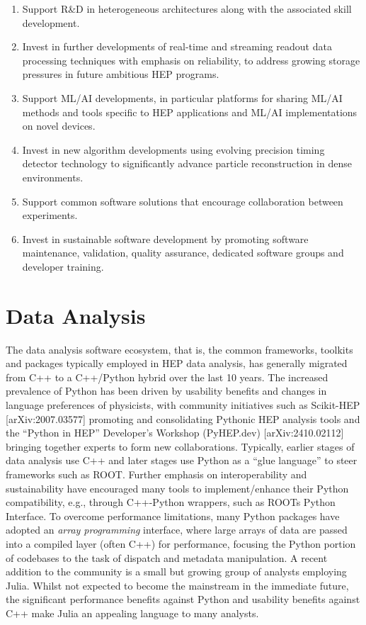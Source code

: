 \begin{enumerate}
\def\labelenumi{\arabic{enumi}.}
\item
  Support R\&D in heterogeneous architectures along with the associated
  skill development.
\item
  Invest in further developments of real-time and streaming readout data
  processing techniques with emphasis on reliability, to address growing
  storage pressures in future ambitious HEP programs.
\item
  Support ML/AI developments, in particular platforms for sharing ML/AI
  methods and tools specific to HEP applications and ML/AI
  implementations on novel devices.
\item
  Invest in new algorithm developments using evolving precision timing
  detector technology to significantly advance particle reconstruction
  in dense environments.
\item
  Support common software solutions that encourage collaboration between
  experiments.
\item
  Invest in sustainable software development by promoting software
  maintenance, validation, quality assurance, dedicated software groups
  and developer training.
\end{enumerate}

\section{Data Analysis}\label{data-analysis}

The data analysis software ecosystem, that is, the common frameworks,
toolkits and packages typically employed in HEP data analysis, has
generally migrated from C++ to a C++/Python hybrid over the last 10
years. The increased prevalence of Python has been driven by usability
benefits and changes in language preferences of physicists, with
community initiatives such as Scikit-HEP {[}arXiv:2007.03577{]}
promoting and consolidating Pythonic HEP analysis tools and the ``Python
in HEP'' Developer's Workshop (PyHEP.dev) {[}arXiv:2410.02112{]}
bringing together experts to form new collaborations. Typically, earlier
stages of data analysis use C++ and later stages use Python as a ``glue
language'' to steer frameworks such as ROOT. Further emphasis on
interoperability and sustainability have encouraged many tools to
implement/enhance their Python compatibility, e.g., through C++-Python
wrappers, such as ROOT\textquotesingle s Python Interface. To overcome
performance limitations, many Python packages have adopted an
\emph{array programming} interface, where large arrays of data are
passed into a compiled layer (often C++) for performance, focusing the
Python portion of codebases to the task of dispatch and metadata
manipulation. A recent addition to the community is a small but growing
group of analysts employing Julia. Whilst not expected to become the
mainstream in the immediate future, the significant performance benefits
against Python and usability benefits against C++ make Julia an
appealing language to many analysts.


